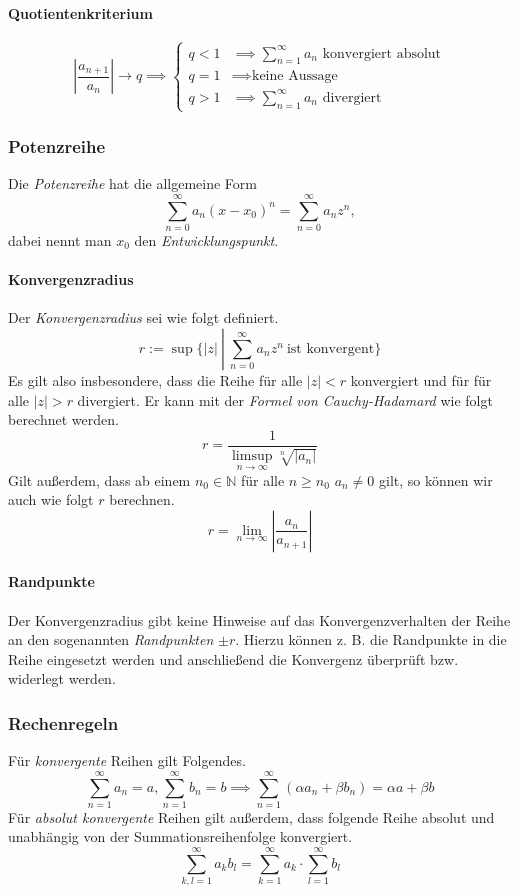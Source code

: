 \documentclass[a4paper, 9pt, DIV=24]{scrartcl}
\newcommand{\N}{\mathbb{N}}
\begin{document}
\paragraph{Quotientenkriterium}
\[
\left| \frac{a_{n+1}}{a_n} \right| \to q \implies
\begin{cases}
  q < 1 & \implies \sum_{n=1}^\infty a_n \text{ konvergiert absolut} \\
  q = 1 & \implies \text{keine Aussage}\\
  q > 1 & \implies \sum_{n=1}^\infty a_n \text{ divergiert}
\end{cases}
\]

\subsubsection{Potenzreihe}
Die \emph{Potenzreihe} hat die allgemeine Form \[ \sum_{n=0}^\infty a_n (x - x_0)^n = \sum_{n=0}^\infty a_n z^n, \]
dabei nennt man $x_0$ den \emph{Entwicklungspunkt}.

\paragraph{Konvergenzradius} Der \emph{Konvergenzradius} sei wie folgt definiert.
\[ r:=\sup \{ |z|\ \left|\ \sum_{n=0}^{\infty}a_n z^n\ \text{ist konvergent}\right.\}\]
Es gilt also insbesondere, dass die Reihe für alle $|z| < r$ konvergiert und für für alle $|z| > r$ divergiert.
Er kann mit der \emph{Formel von Cauchy-Hadamard} wie folgt berechnet werden.
\[ r = \frac{1}{\limsup_{n\to\infty} \sqrt[n]{|a_n|}} \]
Gilt außerdem, dass ab einem $n_0\in\N$ für alle $n \geq n_0$ $a_n \neq 0$ gilt, so können wir auch wie folgt $r$ berechnen.
\[ r = \lim_{n\to\infty} \left | \frac{a_n}{a_{n+1}} \right | \]

\paragraph{Randpunkte}
Der Konvergenzradius gibt keine Hinweise auf das Konvergenzverhalten der Reihe an den sogenannten \emph{Randpunkten} $\pm r$.
Hierzu können z. B. die Randpunkte in die Reihe eingesetzt werden und anschließend die Konvergenz überprüft bzw. widerlegt werden.

\subsubsection{Rechenregeln}
Für \emph{konvergente} Reihen gilt Folgendes.
\[
  \sum_{n=1}^\infty a_n = a, \sum_{n=1}^\infty b_n = b \implies
  \sum_{n=1}^\infty (\alpha a_n + \beta b_n) = \alpha a + \beta b
\]
Für \emph{absolut konvergente} Reihen gilt außerdem, dass folgende Reihe absolut und unabhängig von der Summationsreihenfolge konvergiert.
\[
  \sum_{k,l=1}^\infty a_k b_l = \sum_{k=1}^\infty a_k \cdot \sum_{l=1}^\infty b_l
\]
\end{document}

